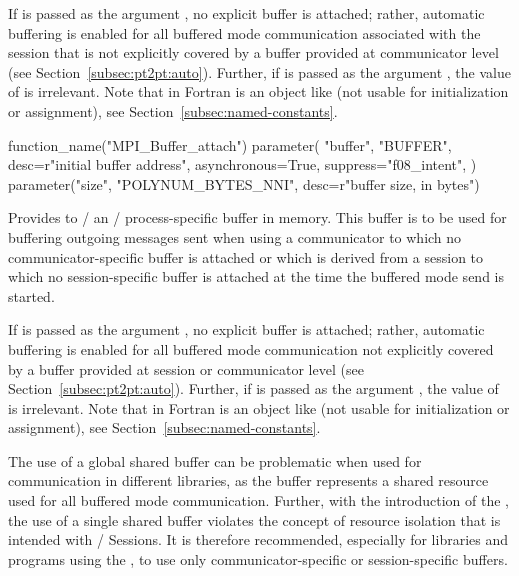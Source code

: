 If  is passed as the argument , no explicit buffer is attached; rather, automatic buffering is enabled for all buffered mode communication associated with the session  that is not explicitly covered by a buffer provided at communicator level (see Section~\ref{subsec:pt2pt:auto}).
Further, if  is passed as the argument , the value of  is irrelevant.
Note that in Fortran  is an
object like  (not usable for initialization or
assignment), see Section~\ref{subsec:named-constants}.

\begin{mpi-binding}
    function_name("MPI_Buffer_attach")
    parameter(
        "buffer",
        "BUFFER",
        desc=r"initial buffer address",
        asynchronous=True,
        suppress="f08_intent",
    )
    parameter("size", "POLYNUM_BYTES_NNI", desc=r"buffer size, in bytes")
\end{mpi-binding}

Provides to \MPI/ an \MPI/ process-specific buffer in memory. This buffer is to be used for buffering outgoing
messages sent when using a communicator to which no communicator-specific buffer is attached or which is derived from a session to which no session-specific buffer is attached at the time the buffered mode send is started.

If  is passed as the argument , no explicit buffer is attached; rather, automatic buffering is enabled for all buffered mode communication not explicitly covered by a buffer provided at session or communicator level (see Section~\ref{subsec:pt2pt:auto}).
Further, if  is passed as the argument , the value of  is irrelevant.
Note that in Fortran  is an
object like  (not usable for initialization or
assignment), see Section~\ref{subsec:named-constants}.


\begin{users}
The use of a global shared buffer can be problematic when used for communication in different libraries, as the buffer represents a shared resource used for all buffered mode communication. Further, with the introduction of the \spm, the use of a single shared buffer violates the concept of resource isolation that is intended with \MPI/ Sessions. It is therefore recommended, especially for libraries and programs using the \spm, to use only communicator-specific or session-specific buffers.
\end{users}

